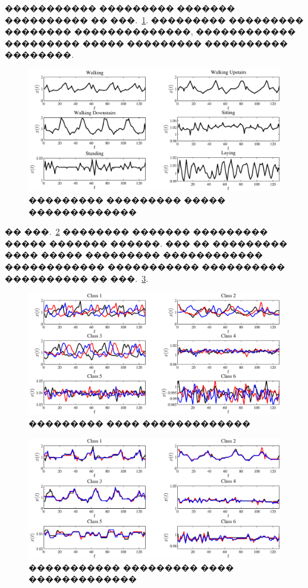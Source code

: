 \documentclass[12pt,twoside, notitlepage]{article}
\begin{document}
����������� ��������� ������� ���������� �� ���.~\ref{centroids_real}.
��������� ��������� �������� ��������������, ������������ ��������� ����� ��������� ���������� ��������.
\begin{figure}[h]
\centering
    \includegraphics[width=1\linewidth]{fig/centroids_200_2}
    \caption{��������� ��������� ����� �������������}
\label{centroids_real}
\end{figure}
�� ���.~\ref{raw_ts} �������� ������� ��������� ����� ������� ������. ��� �� ��������� ���� ����� ��������� ������������ ������������ ����������� ���������� ���������� �� ���.~\ref{aligned_ts}.
\begin{figure}[!h]
\centering
    \includegraphics[width=1\linewidth]{fig/raw_ts}
    \caption{��������� ���� �������������}
\label{raw_ts}
\end{figure}
\begin{figure}[!h]
\centering
    \includegraphics[width=1\linewidth]{fig/aligned_ts}
    \caption{����������� ��������� ���� �������������}
\label{aligned_ts}
\end{figure}
\end{document}
